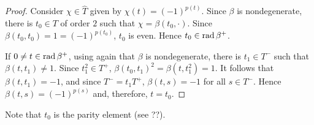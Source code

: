 \begin{proof}
    Consider $\chi \in \widehat{T}$ given by $\chi(t) = (-1)^{p(t)}$. 
    Since $\beta$ is nondegenerate, there is $t_0\in T$ of order $2$ such that $\chi = \beta(t_0, \cdot)$. 
    Since $\beta(t_0, t_0) = 1 = (-1)^{p(t_0)}$, $t_0$ is even. 
    Hence $t_0 \in \operatorname{rad} \beta^+$. 
    
    If $0 \neq t \in \operatorname{rad} \beta^+$, using again that $\beta$ is nondegenerate, there is $t_1 \in T^-$ such that $\beta(t, t_1) \neq 1$. 
    Since $t_1^2 \in T^+$, $\beta(t_0, t_1)^2 = \beta(t, t_1^2) = 1$. 
    It follows that $\beta(t, t_1) = -1$, and since $T^- = t_1 T^+$, $\beta(t, s) = -1$ for all $s\in T^-$. 
    Hence $\beta(t, s) = (-1)^{p(s)}$ and, therefore, $t = t_0$.
\end{proof}

\begin{remark}
    Note that $t_0$ is the parity element (see ??).
\end{remark}


    

